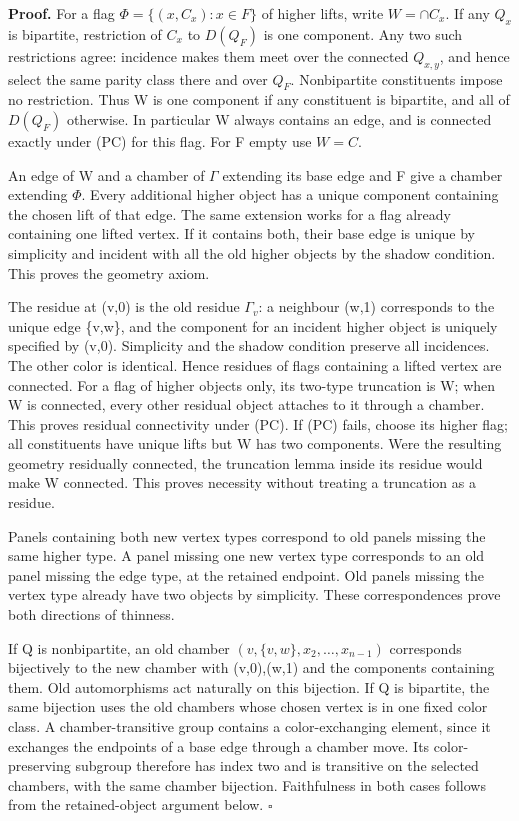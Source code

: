 \textbf{Proof.} For a flag \(\Phi =\{(x,C_x):x\in F\}\) of higher lifts,
write \(W=\cap C_x\). If any \(Q_x\) is bipartite, restriction of
\(C_x\) to \(D(Q_F)\) is one component. Any two such restrictions agree:
incidence makes them meet over the connected \(Q_{x,y}\), and hence
select the same parity class there and over \(Q_F\). Nonbipartite
constituents impose no restriction. Thus W is one component if any
constituent is bipartite, and all of \(D(Q_F)\) otherwise. In particular
W always contains an edge, and is connected exactly under (PC) for this
flag. For F empty use \(W=C\).

An edge of W and a chamber of \(\Gamma\) extending its base edge and F
give a chamber extending \(\Phi\). Every additional higher object has a
unique component containing the chosen lift of that edge. The same
extension works for a flag already containing one lifted vertex. If it
contains both, their base edge is unique by simplicity and incident with
all the old higher objects by the shadow condition. This proves the
geometry axiom.

The residue at (v,0) is the old residue \(\Gamma _v\): a neighbour (w,1)
corresponds to the unique edge \{v,w\}, and the component for an
incident higher object is uniquely specified by (v,0). Simplicity and
the shadow condition preserve all incidences. The other color is
identical. Hence residues of flags containing a lifted vertex are
connected. For a flag of higher objects only, its two-type truncation is
W; when W is connected, every other residual object attaches to it
through a chamber. This proves residual connectivity under (PC). If (PC)
fails, choose its higher flag; all constituents have unique lifts but W
has two components. Were the resulting geometry residually connected,
the truncation lemma inside its residue would make W connected. This
proves necessity without treating a truncation as a residue.

Panels containing both new vertex types correspond to old panels missing
the same higher type. A panel missing one new vertex type corresponds to
an old panel missing the edge type, at the retained endpoint. Old panels
missing the vertex type already have two objects by simplicity. These
correspondences prove both directions of thinness.

If Q is nonbipartite, an old chamber
\((v,\{v,w\},x_{2},\ldots ,x_{n-1})\) corresponds bijectively to the new
chamber with (v,0),(w,1) and the components containing them. Old
automorphisms act naturally on this bijection. If Q is bipartite, the
same bijection uses the old chambers whose chosen vertex is in one fixed
color class. A chamber-transitive group contains a color-exchanging
element, since it exchanges the endpoints of a base edge through a
chamber move. Its color-preserving subgroup therefore has index two and
is transitive on the selected chambers, with the same chamber bijection.
Faithfulness in both cases follows from the retained-object argument
below. \(\square\)


